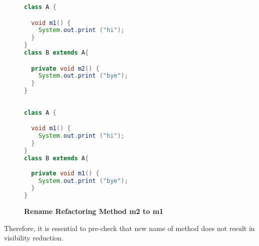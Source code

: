 \begin{figure}[th]
\centering
\begin{minipage}[t]{0.47\linewidth}
\begin{lstlisting}[language=java, basicstyle=\scriptsize\ttfamily,frame=single]
class A {

  void m1() {
    System.out.print ("hi");
  }
}
class B extends A{

  private void m2() {
    System.out.print ("bye");
  }	
}
 
\end{lstlisting}
\end{minipage}
\hfill
\begin{minipage}[t]{0.47\linewidth}
\begin{lstlisting}[language=java, basicstyle=\scriptsize\ttfamily,frame=single]
class A {

  void m1() {
    System.out.print ("hi");
  }
}
class B extends A{
 
  private void m1() {
    System.out.print ("bye");
  }	
}

\end{lstlisting}
\end{minipage}
\caption{\textbf{Rename Refactoring Method m2 to m1}}
\label{fig:RmR3}
\end{figure}

Therefore, it is essential to pre-check that new name of method does not result in visibility reduction. 